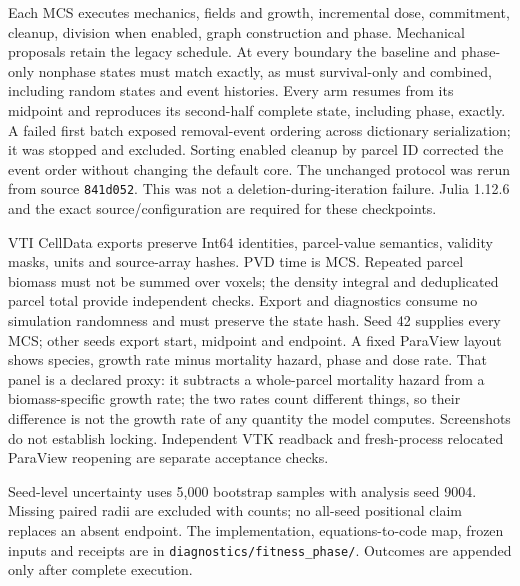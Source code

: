 \documentclass[11pt]{article}
\begin{document}
Each MCS executes mechanics, fields and growth, incremental dose, commitment, cleanup,
division when enabled, graph construction and phase. Mechanical proposals retain the
legacy schedule. At every boundary the baseline and phase-only nonphase states must
match exactly, as must survival-only and combined, including random states and event
histories. Every arm resumes from its midpoint and reproduces its second-half complete
state, including phase, exactly. A failed first batch exposed removal-event ordering
across dictionary serialization; it was stopped and excluded. Sorting enabled cleanup
by parcel ID corrected the event order without changing the default core. The unchanged
protocol was rerun from source \texttt{841d052}. This was not a deletion-during-iteration
failure. Julia 1.12.6 and the exact source/configuration are required for these checkpoints.

VTI CellData exports preserve Int64 identities, parcel-value semantics, validity masks,
units and source-array hashes. PVD time is MCS. Repeated parcel biomass must not be summed
over voxels; the density integral and deduplicated parcel total provide independent
checks. Export and diagnostics consume no simulation randomness and must preserve the
state hash. Seed 42 supplies every MCS; other seeds export start, midpoint and endpoint.
A fixed ParaView layout shows species, growth rate minus mortality hazard, phase and dose rate. That panel is a declared proxy: it subtracts a whole-parcel mortality hazard from a biomass-specific growth rate; the two rates count different things, so their difference is not the growth rate of any quantity the model computes.
Screenshots do not establish locking. Independent VTK readback and fresh-process relocated
ParaView reopening are separate acceptance checks.

Seed-level uncertainty uses 5,000 bootstrap samples with analysis seed 9004. Missing paired
radii are excluded with counts; no all-seed positional claim replaces an absent endpoint.
The implementation, equations-to-code map, frozen inputs and receipts are in
\texttt{diagnostics/fitness\_phase/}. Outcomes are appended only after complete execution.
\end{document}
